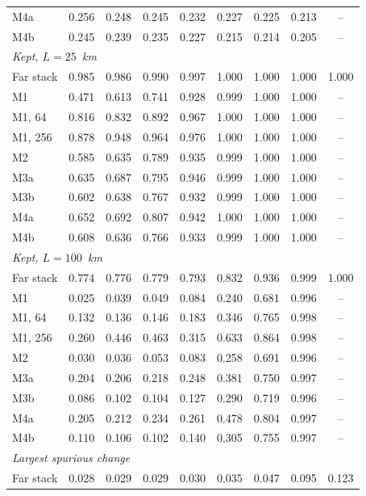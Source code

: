 \documentclass[preprint,12pt,authoryear]{elsarticle}
\begin{document}
\begin{table}[tbp]
\begin{tabular}{lcccccccc}
    M4a & 0.256 & 0.248 & 0.245 & 0.232 & 0.227 & 0.225 & 0.213 & -- \\
    M4b & 0.245 & 0.239 & 0.235 & 0.227 & 0.215 & 0.214 & 0.205 & -- \\
    \multicolumn{9}{l}{\textit{Kept, $L = 25$~km}} \\
    Far stack & 0.985 & 0.986 & 0.990 & 0.997 & 1.000 & 1.000 & 1.000 & 1.000 \\
    M1 & 0.471 & 0.613 & 0.741 & 0.928 & 0.999 & 1.000 & 1.000 & -- \\
    M1, 64 & 0.816 & 0.832 & 0.892 & 0.967 & 1.000 & 1.000 & 1.000 & -- \\
    M1, 256 & 0.878 & 0.948 & 0.964 & 0.976 & 1.000 & 1.000 & 1.000 & -- \\
    M2 & 0.585 & 0.635 & 0.789 & 0.935 & 0.999 & 1.000 & 1.000 & -- \\
    M3a & 0.635 & 0.687 & 0.795 & 0.946 & 0.999 & 1.000 & 1.000 & -- \\
    M3b & 0.602 & 0.638 & 0.767 & 0.932 & 0.999 & 1.000 & 1.000 & -- \\
    M4a & 0.652 & 0.692 & 0.807 & 0.942 & 1.000 & 1.000 & 1.000 & -- \\
    M4b & 0.608 & 0.636 & 0.766 & 0.933 & 0.999 & 1.000 & 1.000 & -- \\
    \multicolumn{9}{l}{\textit{Kept, $L = 100$~km}} \\
    Far stack & 0.774 & 0.776 & 0.779 & 0.793 & 0.832 & 0.936 & 0.999 & 1.000 \\
    M1 & 0.025 & 0.039 & 0.049 & 0.084 & 0.240 & 0.681 & 0.996 & -- \\
    M1, 64 & 0.132 & 0.136 & 0.146 & 0.183 & 0.346 & 0.765 & 0.998 & -- \\
    M1, 256 & 0.260 & 0.446 & 0.463 & 0.315 & 0.633 & 0.864 & 0.998 & -- \\
    M2 & 0.030 & 0.036 & 0.053 & 0.083 & 0.258 & 0.691 & 0.996 & -- \\
    M3a & 0.204 & 0.206 & 0.218 & 0.248 & 0.381 & 0.750 & 0.997 & -- \\
    M3b & 0.086 & 0.102 & 0.104 & 0.127 & 0.290 & 0.719 & 0.996 & -- \\
    M4a & 0.205 & 0.212 & 0.234 & 0.261 & 0.478 & 0.804 & 0.997 & -- \\
    M4b & 0.110 & 0.106 & 0.102 & 0.140 & 0.305 & 0.755 & 0.997 & -- \\
    \multicolumn{9}{l}{\textit{Largest spurious change}} \\
    Far stack & 0.028 & 0.029 & 0.029 & 0.030 & 0.035 & 0.047 & 0.095 & 0.123 \\

\end{tabular}
\end{table}
\end{document}
